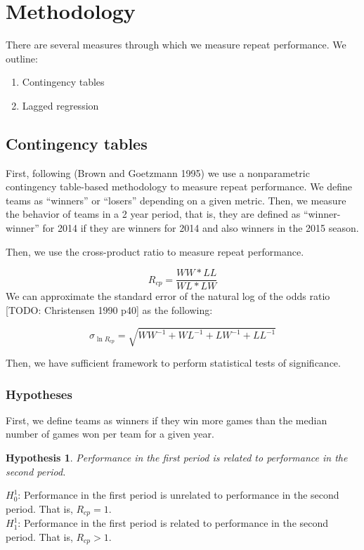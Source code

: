 \documentclass[11pt,]{article}
\newtheorem{hypothesis}{Hypothesis}
\providecommand{\tightlist}{%
  \setlength{\itemsep}{0pt}\setlength{\parskip}{0pt}}
\begin{document}
\section{Methodology}\label{methodology}

There are several measures through which we measure repeat performance.
We outline:

\begin{enumerate}
\def\labelenumi{\arabic{enumi}.}
\tightlist
\item
  Contingency tables
\item
  Lagged regression
\end{enumerate}

\subsection{Contingency tables}\label{contingency-tables}

First, following (Brown and Goetzmann 1995) we use a nonparametric
contingency table-based methodology to measure repeat performance. We
define teams as ``winners'' or ``losers'' depending on a given metric.
Then, we measure the behavior of teams in a 2 year period, that is, they
are defined as ``winner-winner'' for 2014 if they are winners for 2014
and also winners in the 2015 season.

Then, we use the cross-product ratio to measure repeat performance.

\[R_{cp} = \frac{WW * LL}{WL*LW} \] We can approximate the standard
error of the natural log of the odds ratio {[}TODO: Christensen 1990
p40{]} as the following:

\[\sigma_{\ln R_{cp}} = \sqrt{WW^{-1} + WL^{-1} + LW^{-1} + LL^{-1}}\]

Then, we have sufficient framework to perform statistical tests of
significance.

\subsubsection{Hypotheses}\label{hypotheses}

First, we define teams as winners if they win more games than the median
number of games won per team for a given year.

\begin{framed}
\begin{hypothesis}
Performance in the first period is related to performance in the second period. 
\end{hypothesis}

\noindent $H_{0}^1$: Performance in the first period is unrelated to performance in the second period. That is, $R_{cp} = 1$. \\ 
$H_{1}^1$: Performance in the first period is related to performance in the second period. That is, $R_{cp} > 1$. 
\end{framed}
\end{document}
